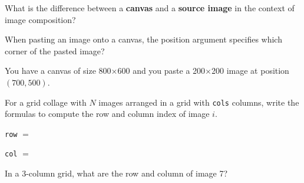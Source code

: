 \documentclass{csexam}
\begin{document}
\begin{questions}

\question[2] What is the difference between a \textbf{canvas} and a \textbf{source image} in the context of image composition?

\vspace{1.5in}

\question[2] When pasting an image onto a canvas, the position argument specifies which corner of the pasted image?

\vspace{0.3cm}
\underline{\hspace{4in}}
\vspace{0.5in}

\question[3] You have a canvas of size 800$\times$600 and you paste a 200$\times$200 image at position $(700, 500)$.


\question[3] For a grid collage with $N$ images arranged in a grid with \texttt{cols} columns, write the formulas to compute the row and column index of image $i$.

\vspace{0.3cm}
\texttt{row} $=$ \underline{\hspace{2.5in}}

\vspace{0.3cm}
\texttt{col} $=$ \underline{\hspace{2.5in}}

\vspace{0.3cm}
In a 3-column grid, what are the row and column of image 7?


\end{questions}
\end{document}
